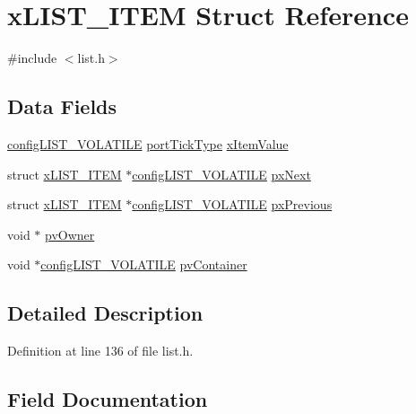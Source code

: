 \hypertarget{structxLIST__ITEM}{}\section{x\+L\+I\+S\+T\+\_\+\+I\+T\+EM Struct Reference}
\label{structxLIST__ITEM}


{\ttfamily \#include $<$list.\+h$>$}

\subsection*{Data Fields}
\begin{DoxyCompactItemize}
\item 
\hyperlink{list_8h_a2d5de557c5561c8980d1bf51d87d8cba}{config\+L\+I\+S\+T\+\_\+\+V\+O\+L\+A\+T\+I\+LE} \hyperlink{portmacro_8h_a4d746b2ff8fafc490b764c66411ec457}{port\+Tick\+Type} \hyperlink{structxLIST__ITEM_acdfef3a9fbae98cef8adc272850ef31c}{x\+Item\+Value}
\item 
struct \hyperlink{structxLIST__ITEM}{x\+L\+I\+S\+T\+\_\+\+I\+T\+EM} $\ast$\hyperlink{list_8h_a2d5de557c5561c8980d1bf51d87d8cba}{config\+L\+I\+S\+T\+\_\+\+V\+O\+L\+A\+T\+I\+LE} \hyperlink{structxLIST__ITEM_a03713c4ee953ef5ca6adbec883720c60}{px\+Next}
\item 
struct \hyperlink{structxLIST__ITEM}{x\+L\+I\+S\+T\+\_\+\+I\+T\+EM} $\ast$\hyperlink{list_8h_a2d5de557c5561c8980d1bf51d87d8cba}{config\+L\+I\+S\+T\+\_\+\+V\+O\+L\+A\+T\+I\+LE} \hyperlink{structxLIST__ITEM_ae8e553eae41010a8e41c66d76c94110b}{px\+Previous}
\item 
void $\ast$ \hyperlink{structxLIST__ITEM_aeb3110b50fe0dbce826d929b27b5ddb1}{pv\+Owner}
\item 
void $\ast$\hyperlink{list_8h_a2d5de557c5561c8980d1bf51d87d8cba}{config\+L\+I\+S\+T\+\_\+\+V\+O\+L\+A\+T\+I\+LE} \hyperlink{structxLIST__ITEM_a341462d06236aa07eaf1a864e4b59951}{pv\+Container}
\end{DoxyCompactItemize}


\subsection{Detailed Description}


Definition at line 136 of file list.\+h.



\subsection{Field Documentation}
\mbox{\label{structxLIST__ITEM_a341462d06236aa07eaf1a864e4b59951}} 
